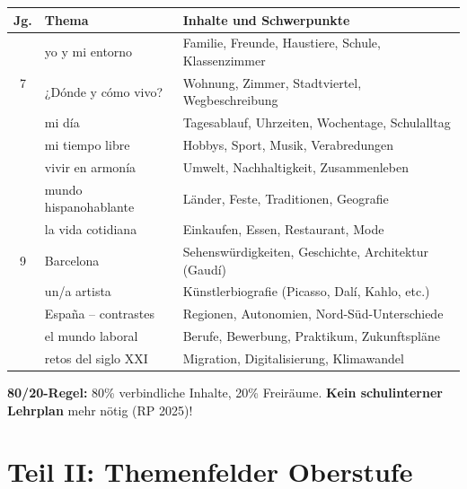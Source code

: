 \documentclass[11pt,a4paper]{article}
\begin{document}
\begin{center}
\begin{tabularx}{\textwidth}{c|l|X}
\rowcolor{lightblue}
\textbf{Jg.} & \textbf{Thema} & \textbf{Inhalte und Schwerpunkte} \\
\hline
\multirow{3}{*}{7} & yo y mi entorno & Familie, Freunde, Haustiere, Schule, Klassenzimmer \\
& ¿Dónde y cómo vivo? & Wohnung, Zimmer, Stadtviertel, Wegbeschreibung \\
& mi día & Tagesablauf, Uhrzeiten, Wochentage, Schulalltag \\
\hline
\rowcolor{lightgray}
\multirow{3}{*}{8} & mi tiempo libre & Hobbys, Sport, Musik, Verabredungen \\
\rowcolor{lightgray}
& vivir en armonía & Umwelt, Nachhaltigkeit, Zusammenleben \\
\rowcolor{lightgray}
& mundo hispanohablante & Länder, Feste, Traditionen, Geografie \\
\hline
\multirow{3}{*}{9} & la vida cotidiana & Einkaufen, Essen, Restaurant, Mode \\
& Barcelona & Sehenswürdigkeiten, Geschichte, Architektur (Gaudí) \\
& un/a artista & Künstlerbiografie (Picasso, Dalí, Kahlo, etc.) \\
\hline
\rowcolor{lightgray}
\multirow{3}{*}{10} & España -- contrastes & Regionen, Autonomien, Nord-Süd-Unterschiede \\
\rowcolor{lightgray}
& el mundo laboral & Berufe, Bewerbung, Praktikum, Zukunftspläne \\
\rowcolor{lightgray}
& retos del siglo XXI & Migration, Digitalisierung, Klimawandel \\
\hline
\end{tabularx}
\end{center}

\begin{wichtigbox}
\textbf{80/20-Regel:} 80\% verbindliche Inhalte, 20\% Freiräume. \textbf{Kein schulinterner Lehrplan} mehr nötig (RP 2025)!
\end{wichtigbox}

\newpage
\part*{Teil II: Themenfelder Oberstufe}
\end{document}
